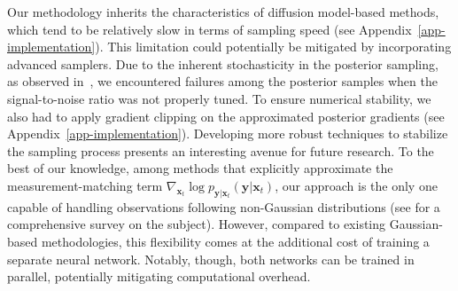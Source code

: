 Our methodology inherits the characteristics of diffusion model-based methods, which tend to be relatively slow in terms of sampling speed (see Appendix~\ref{app-implementation}). This limitation could potentially be mitigated by incorporating advanced samplers.
Due to the inherent stochasticity in the posterior sampling, as observed in~\citet{chung2023}, we encountered failures among the posterior samples when the signal-to-noise ratio was not properly tuned. To ensure numerical stability, we also had to apply gradient clipping on the approximated posterior gradients (see Appendix~\ref{app-implementation}). Developing more robust techniques to stabilize the sampling process presents an interesting avenue for future research.
To the best of our knowledge, among methods that explicitly approximate the measurement-matching term $\nabla_{\mathbf{x}_t}\log p_{\mathbf{y}\vert\mathbf{x}_t}(\mathbf{y}\vert\mathbf{x}_t)$, our approach is the only one capable of handling observations following non-Gaussian distributions (see \citet{Daras2024} for a comprehensive survey on the subject). However, compared to existing Gaussian-based methodologies, this flexibility comes at the additional cost of training a separate neural network. Notably, though, both networks can be trained in parallel, potentially mitigating computational overhead.







